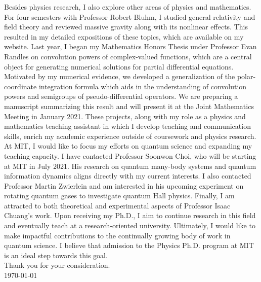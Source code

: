 \documentclass[12pt]{article}
\begin{document}
Besides physics research, I also explore other areas of physics and mathematics. For four semesters with Professor Robert Bluhm, I studied general relativity and field theory and reviewed massive gravity along with its nonlinear effects. This resulted in my detailed expositions of these topics, which are available on my website. Last year, I began my Mathematics Honors Thesis under Professor Evan Randles on convolution powers of complex-valued functions, which are a central object for generating numerical solutions for partial differential equations. Motivated by my numerical evidence, we developed a generalization of the polar-coordinate integration formula which aids in the understanding of convolution powers and semigroups of pseudo-differential operators. We are preparing a manuscript summarizing this result and will present it at the Joint Mathematics Meeting in January 2021. These projects, along with my role as a physics and mathematics teaching assistant in which I develop teaching and communication skills, enrich my academic experience outside of coursework and physics research.  \\ 

At MIT, I would like to focus my efforts on quantum science and expanding my teaching capacity. I have contacted Professor Soonwon Choi, who will be starting at MIT in July 2021. His research on quantum many-body systems and quantum information dynamics aligns directly with my current interests. I also contacted Professor Martin Zwierlein and am interested in his upcoming experiment on rotating quantum gases to investigate quantum Hall physics. Finally, I am attracted to both theoretical and experimental aspects of Professor Isaac Chuang's work. Upon receiving my Ph.D., I aim to continue research in this field and eventually teach at a research-oriented university. Ultimately, I would like to make impactful contributions to the continually growing body of work in quantum science. I believe that admission to the Physics Ph.D. program at MIT is an ideal step towards this goal. \\

\noindent Thank you for your consideration. \\

\noindent \today
	











	
	
	
	
	
\end{document}
